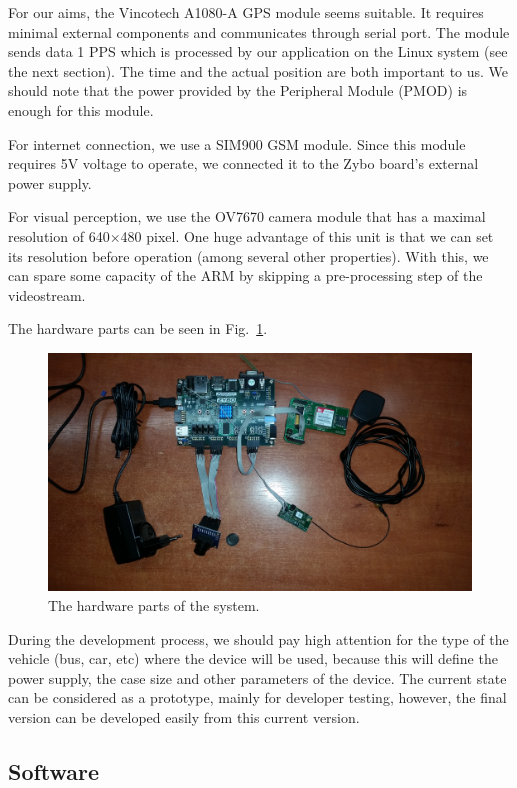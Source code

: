 \documentclass[b5paper,12pt]{report}
\theoremstyle{definition}
\begin{document}
For our aims, the Vincotech A1080-A GPS module seems suitable. It requires minimal external components and communicates through serial port. The module sends data 1 PPS which is processed by our application on the Linux system (see the next section). The time and the actual position are both important to us. We should note that the power provided by the Peripheral Module (PMOD) is enough for this module.

For internet connection, we use a SIM900 GSM module. Since this module requires 5V voltage to operate, we connected it to the Zybo board's external power supply.

For visual perception, we use the OV7670 camera module that has a maximal resolution of 640$\times$480 pixel. One huge advantage of this unit is that we can set its resolution before operation (among several other properties). With this, we can spare some capacity of the ARM by skipping a pre-processing step of the videostream.

The hardware parts can be seen in Fig.~\ref{currentsys}.

\begin{figure}[ht]
\centerline{
\includegraphics[width=12cm]{img/currentsys.jpg}}
\caption{The hardware parts of the system.}
\label{currentsys}
\end{figure}

During the development process, we should pay high attention for the type of the vehicle (bus, car, etc) where the device will be used, because this will define the power supply, the case size and other parameters of the device. The current state can be considered as a prototype, mainly for developer testing, however, the final version can be developed easily from this current version.

\subsection{Software}
\label{rttasw}
\end{document}
